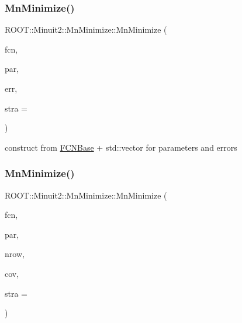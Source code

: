 \subsubsection{\texorpdfstring{MnMinimize()}{MnMinimize()}\hspace{0.1cm}{\footnotesize\ttfamily [14/39]}}
{\footnotesize\ttfamily R\+O\+O\+T\+::\+Minuit2\+::\+Mn\+Minimize\+::\+Mn\+Minimize (\begin{DoxyParamCaption}\item[{const \mbox{\hyperlink{classROOT_1_1Minuit2_1_1FCNBase}{F\+C\+N\+Base}} \&}]{fcn,  }\item[{const std\+::vector$<$ double $>$ \&}]{par,  }\item[{const std\+::vector$<$ double $>$ \&}]{err,  }\item[{unsigned int}]{stra = {} }\end{DoxyParamCaption})\hspace{0.3cm}{\ttfamily [inline]}}



construct from \mbox{\hyperlink{classROOT_1_1Minuit2_1_1FCNBase}{F\+C\+N\+Base}} + std\+::vector for parameters and errors 

\mbox{\label{classROOT_1_1Minuit2_1_1MnMinimize_ad6015768309e01c6610185006008b2d5}} 
\subsubsection{\texorpdfstring{MnMinimize()}{MnMinimize()}\hspace{0.1cm}{\footnotesize\ttfamily [15/39]}}
{\footnotesize\ttfamily R\+O\+O\+T\+::\+Minuit2\+::\+Mn\+Minimize\+::\+Mn\+Minimize (\begin{DoxyParamCaption}\item[{const \mbox{\hyperlink{classROOT_1_1Minuit2_1_1FCNBase}{F\+C\+N\+Base}} \&}]{fcn,  }\item[{const std\+::vector$<$ double $>$ \&}]{par,  }\item[{unsigned int}]{nrow,  }\item[{const std\+::vector$<$ double $>$ \&}]{cov,  }\item[{unsigned int}]{stra = {} }\end{DoxyParamCaption})\hspace{0.3cm}{\ttfamily [inline]}}



